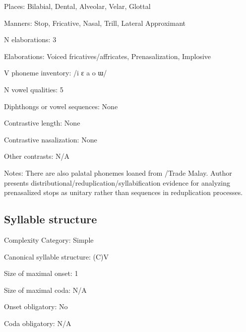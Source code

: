 {\begin{appendixdesc}
\item[Places:] Bilabial, Dental, Alveolar, Velar, Glottal

\item[Manners:] Stop, Fricative, Nasal, Trill, Lateral Approximant

\item[N elaborations:] 3

\item[Elaborations:] Voiced fricatives/affricates, Prenasalization, Implosive

\item[V phoneme inventory:] /i ɛ a o ɯ/

\item[N vowel qualities:] 5

\item[Diphthongs or vowel sequences:] None

\item[Contrastive length:] None

\item[Contrastive nasalization:] None

\item[Other contrasts:] N/A

\item[Notes:] There are also palatal phonemes loaned from /Trade Malay. Author presents distributional/reduplication/syllabification evidence for analyzing prenasalized stops as unitary rather than sequences in reduplication processes.
\end{appendixdesc}
\subsection*{Syllable structure}
\begin{appendixdesc}

\item[Complexity Category:] Simple

\item[Canonical syllable structure:] (C)V \citep[30--31]{Donohue1999}

\item[Size of maximal onset:] 1

\item[Size of maximal coda:] N/A

\item[Onset obligatory:] No

\item[Coda obligatory:] N/A


\end{appendixdesc}}

